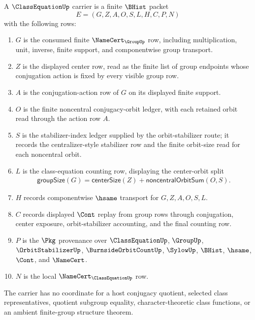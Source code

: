 \begin{definition}
\label{def:class-equation-carrier}
A $\ClassEquationUp$ carrier is a finite $\BHist$ packet
$$
E=(G,Z,A,O,S,L,H,C,P,N)
$$
with the following rows:
\begin{enumerate}
\item $G$ is the consumed finite $\NameCert_{\GroupUp}$ row, including multiplication, unit, inverse, finite support, and componentwise group transport.
\item $Z$ is the displayed center row, read as the finite list of group endpoints whose conjugation action is fixed by every visible group row.
\item $A$ is the conjugation-action row of $G$ on its displayed finite support.
\item $O$ is the finite noncentral conjugacy-orbit ledger, with each retained orbit read through the action row $A$.
\item $S$ is the stabilizer-index ledger supplied by the orbit-stabilizer route; it records the centralizer-style stabilizer row and the finite orbit-size read for each noncentral orbit.
\item $L$ is the class-equation counting row, displaying the center-orbit split
$$
\begin{aligned}
\mathsf{groupSize}(G) =
\mathsf{centerSize}(Z) + \mathsf{noncentralOrbitSum}(O,S).
\end{aligned}
$$
\item $H$ records componentwise $\hsame$ transport for $G,Z,A,O,S,L$.
\item $C$ records displayed $\Cont$ replay from group rows through conjugation, center exposure, orbit-stabilizer accounting, and the final counting row.
\item $P$ is the $\Pkg$ provenance over $\ClassEquationUp$, $\GroupUp$, $\OrbitStabilizerUp$, $\BurnsideOrbitCountUp$, $\SylowUp$, $\BHist$, $\hsame$, $\Cont$, and $\NameCert$.
\item $N$ is the local $\NameCert_{\ClassEquationUp}$ row.
\end{enumerate}
The carrier has no coordinate for a host conjugacy quotient, selected class representatives, quotient subgroup equality, character-theoretic class functions, or an ambient finite-group structure theorem.
\end{definition}

